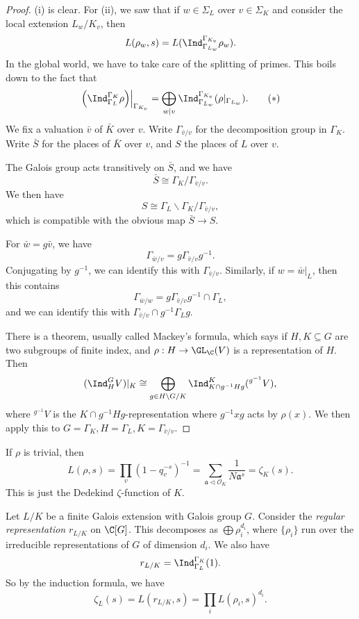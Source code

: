 \documentclass[a4paper]{article}
\begin{document}
\begin{proof}
  (i) is clear. For (ii), we saw that if $w \in \Sigma_L$ over $v \in \Sigma_K$ and consider the local extension $L_w/K_v$, then
  \[
    L(\rho_w, s) = L(\Ind_{\Gamma_{L_w}}^{\Gamma_{K_v}} \rho_w).
  \]
  In the global world, we have to take care of the splitting of primes. This boils down to the fact that
  \[
    \left.\left(\Ind_{\Gamma_L}^{\Gamma_K} \rho\right)\right|_{\Gamma_{K_v}} = \bigoplus_{w \mid v} \Ind_{\Gamma_{L_w}}^{\Gamma_{K_v}} (\rho|_{\Gamma_{L_w}}).\tag{$*$}
  \]
  We fix a valuation $\bar{v}$ of $\bar{K}$ over $v$. Write $\Gamma_{\bar{v}/v}$ for the decomposition group in $\Gamma_K$. Write $\bar{S}$ for the places of $\bar{K}$ over $v$, and $S$ the places of $L$ over $v$.

  The Galois group acts transitively on $\bar{S}$, and we have
  \[
    \bar{S} \cong \Gamma_K/\Gamma_{\bar{v}/v}.
  \]
  We then have
  \[
    S \cong \Gamma_L \backslash \Gamma_K/\Gamma_{\bar{v}/v},
  \]
  which is compatible with the obvious map $\bar{S} \to S$.

  For $\bar{w} = g \bar{v}$, we have
  \[
    \Gamma_{\bar{w}/v} = g \Gamma_{\bar{v}/v} g^{-1}.
  \]
  Conjugating by $g^{-1}$, we can identify this with $\Gamma_{\bar{v}/v}$. Similarly, if $w = \bar{w}|_L$, then this contains
  \[
    \Gamma_{\bar{w}/w} = g \Gamma_{\bar{v}/v} g^{-1} \cap \Gamma_L,
  \]
  and we can identify this with $\Gamma_{\bar{v}/v} \cap g^{-1} \Gamma_L g$.

  There is a theorem, usually called Mackey's formula, which says if $H, K \subseteq G$ are two subgroups of finite index, and $\rho: H \to \GL_\C(V)$ is a representation of $H$. Then
  \[
    (\Ind_H^G V)|_K \cong \bigoplus_{g \in H \backslash G /K} \Ind^K_{K \cap g^{-1}Hg} (^{g^{-1}} V),
  \]
  where $^{g^{-1}} V$ is the $K \cap g^{-1}Hg$-representation where $g^{-1}xg$ acts by $\rho(x)$. We then apply this to $G = \Gamma_K, H = \Gamma_L, K = \Gamma_{\bar{v}/v}$.
\end{proof}

\begin{eg}
  If $\rho$ is trivial, then
  \[
    L(\rho, s) = \prod_v (1 - q_v^{-s})^{-1} = \sum_{\mathfrak{a} \lhd \mathcal{O}_K} \frac{1}{N\mathfrak{a}^s} = \zeta_K(s).
  \]
  This is just the Dedekind $\zeta$-function of $K$.
\end{eg}

\begin{eg}
  Let $L/K$ be a finite Galois extension with Galois group $G$. Consider the \emph{regular representation} $r_{L/K}$ on $\C[G]$. This decomposes as $\bigoplus \rho_i^{d_i}$, where $\{\rho_i\}$ run over the irreducible representations of $G$ of dimension $d_i$. We also have
  \[
    r_{L/K} = \Ind_{\Gamma_L}^{\Gamma_K}(1).
  \]
  So by the induction formula, we have
  \[
    \zeta_L(s) = L(r_{L/K}, s) = \prod_i L(\rho_i, s)^{d_i}.
  \]
\end{eg}
\end{document}
